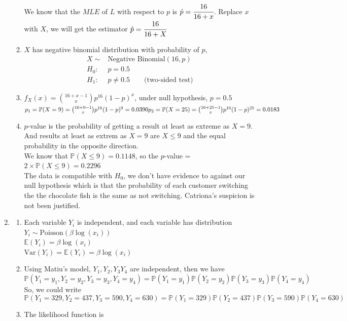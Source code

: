 \documentclass[12pt, oneside, a4paper]{article}
\begin{document}
\begin{enumerate}
\begin{enumerate}[label = (\alph*)]
			
			We know that the $MLE$ of $L$ with respect to $p$ is $\hat{p}  = \cfrac{16}{16+x}$. 
			Replace $x$ with $X$, we will get the estimator $\hat{p} = \cfrac{16}{16+X}$
			\item $X$ has negative binomial distribution with probability of $p$, \begin{align*}
			X  \sim &\text{Negative Binomial}(16, p)\\
			H_0: &p = 0.5 \\
			H_1: & p \neq 0.5 \qquad \text{(two-sided test)}
			\end{align*}
			\item $f_X(x) = \binom{16+x-1}{x}p^{16}(1-p)^x$, under null hypothesis, $p = 0.5$\\
			$p_1 = \mathbb{P}(X=9) = \binom{16+9-1}{x}p^{16}(1-p)^9 =0.0390\\
			p_2 =\mathbb{P}(X=25) = \binom{16+25-1}{x}p^{16}(1-p)^{25} =  0.0183$
			\item $p$-value is the probability of getting a result at least as extreme as $X = 9$. And results at least as extrem as $X = 9$ are $X \leq  9 $ and the equal probability in the opposite direction. \\
			We know that $\mathbb{P}(X\leq 9) = 0.1148$, so the $p$-value = $2 \times\mathbb{P}(X\leq 9) =  0.2296$\\
			The data is compatible with $H_0$, we don't have evidence to against our null hypothesis which is that the probability of each customer switching the the chocolate fish is the same as not switching. Catriona's suspicion is not been justified. 
		\end{enumerate}
		\item \begin{enumerate}[label = (\alph*)]
			\item Each variable $Y_i$ is independent, and each variable has distribution $Y_i \sim \text{Poisson}(\beta \log(x_i))$\\
			$\mathbb{E}(Y_i) = \beta \log(x_i)$\\
			$\text{Var}(Y_i) = \mathbb{E}(Y_i) = \beta \log(x_i)$
			\item Using Matiu's model, $Y_1, Y_2, Y_3 Y_4$ are independent, then we have 
			\[\mathbb{P}(Y_1 = y_1, Y_2 = y_2, Y_3 = y_3,Y_4 = y_4) = \mathbb{P}(Y_1 = y_1)\mathbb{P}(Y_2 = y_2)\mathbb{P}(Y_3 = y_3)\mathbb{P}(Y_4 = y_4)\]
			So, we could write 
			\[\mathbb{P}(Y_1 = 329, Y_2 = 437, Y_3 = 590,Y_4 = 630) = \mathbb{P}(Y_1 = 329)\mathbb{P}(Y_2 = 437)\mathbb{P}(Y_3 = 590)\mathbb{P}(Y_4 = 630)\]
			\item The likelihood function is \begin{align*}

\end{align*}
\end{enumerate}
\end{enumerate}
\end{document}
